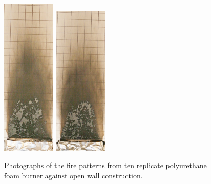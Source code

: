 \documentclass[twoside]{uocthesis}
\begin{document}
\begin{figure}[p]
	\includegraphics[width=1.0in]{../Figures/GBPUF9_IMG_9446}
	\includegraphics[width=1.0in]{../Figures/GBPUF10_IMG_9461} \\

	\caption[Photographs of the fire patterns from ten replicate polyurethane foam burner against open wall construction]{Photographs of the fire patterns from ten replicate polyurethane foam burner against open wall construction.}
	\label{PUF_Open_Wall}
\end{figure}
\end{document}
